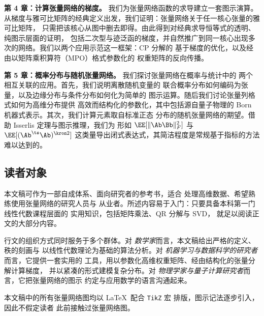 \medskip
\noindent\textbf{第 4 章：计算张量网络的梯度。}
我们为张量网络函数的求导建立一套图示演算。从梯度与雅可比矩阵的经典定义出发，我们证明：张量网络关于任一核心张量的雅可比矩阵，
只需把该核心从图中删去即得。由此得到对经典求导恒等式的透明、纯图示层面的证明，
包括二次型与迹泛函的梯度，并自然推广到同一核心出现多次的网络。我们以两个应用示范这一框架：CP 分解的
基于梯度的优化，以及经由以矩阵乘积算符（MPO）格式参数化的
权重矩阵的反向传播。

\medskip
\noindent\textbf{第 5 章：概率分布与随机张量网络。}
我们探讨张量网络在概率与统计中的
两个相互关联的应用。首先，我们说明离散随机变量的
联合概率分布如何编码为张量，以及边缘分布与条件分布如何化为简单的
图示运算。随后我们讨论张量列格式如何为高维分布提供
高效而结构化的参数化，其中包括源自量子物理的
Born 机器式表示。其次，我们计算元素取自标准正态
分布的随机张量网络的期望。借助 Isserlis 定理与图示推理，我们为
形如
$\EE[\|\Ab\Bb\|_F^2]$ 与
$\EE[(\Ab^\ts \Ab)^{\kron 2}]$ 这类量导出闭式表达式，其简洁程度是常规基于指标的方法难以达到的。

\bigskip
\subsection*{读者对象}

本文稿可作为一部自成体系、面向研究者的参考书，适合
处理高维数据、希望熟练使用张量网络的研究人员与
从业者。所述内容易于入门：只要具备本科第一门线性代数课程层面的
实用知识，包括矩阵乘法、QR 分解与 SVD，
就足以阅读正文的大部分内容。

行文的组织方式同时服务于多个群体。对
\textit{数学家}而言，本文稿给出严格的定义、秩的刻画与
以线性代数理论为基础的算法分析。对
\textit{机器学习与数据科学的研究者}而言，它提供一套实用的
工具，用以参数化高维权重矩阵、经由结构化的张量分解计算梯度，
并以紧凑的形式建模复杂分布。对
\textit{物理学家与量子计算研究者}而言，它把张量网络的图示
约定与应用数学的语言沟通起来。 

本文稿中的所有张量网络图均以 \LaTeX\ 配合 \texttt{TikZ} 宏
排版，图示记法逐步引入，因此不假定读者
此前接触过张量网络图。


